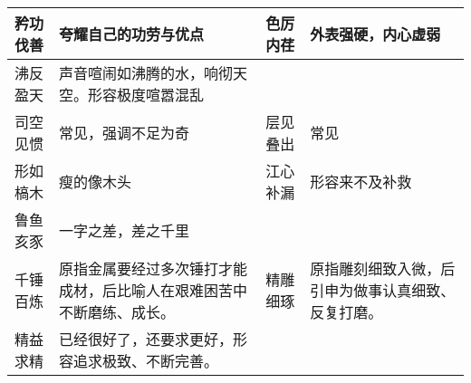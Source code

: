\begin{longtable}{|p{}|p{}|p{}|p{}|}
\hline
矜功伐善 & 夸耀自己的功劳与优点 & 色厉内荏 & 外表强硬，内心虚弱 \\
\hline
沸反盈天 & 声音喧闹如沸腾的水，响彻天空。形容极度喧嚣混乱 & & \\
\hline
司空见惯 & 常见，强调不足为奇 & 层见叠出 & 常见 \\
\hline
形如槁木 & 瘦的像木头 & 江心补漏 & 形容来不及补救 \\
\hline
鲁鱼亥豕 & 一字之差，差之千里 & & \\
\hline
千锤百炼 & 原指金属要经过多次锤打才能成材，后比喻人在艰难困苦中不断磨练、成长。 & 精雕细琢 & 原指雕刻细致入微，后引申为做事认真细致、反复打磨。 \\
\hline
精益求精 & 已经很好了，还要求更好，形容追求极致、不断完善。 & & \\
\hline
\end{longtable}

